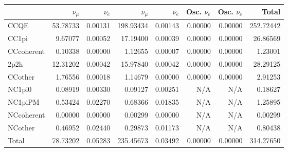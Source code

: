 \begin{tabular} { | l ||r | r | r | r | r | r | | r | }
\hline
              & $\nu_\mu$            & $\nu_e$              & $\bar{\nu}_{\mu}$    & $\bar{\nu}_{e}$      & Osc. $\nu_e$         & Osc. $\bar{\nu}_{e}$ & Total                \\ \hline\hline
 CCQE         & 53.78733             & 0.00131              & 198.93434            & 0.00143              & 0.00000              & 0.00000              & 252.72442            \\ \hline
 CC1pi        & 9.67077              & 0.00052              & 17.19400             & 0.00039              & 0.00000              & 0.00000              & 26.86569             \\ \hline
 CCcoherent   & 0.10338              & 0.00000              & 1.12655              & 0.00007              & 0.00000              & 0.00000              & 1.23001              \\ \hline
 2p2h         & 12.31202             & 0.00042              & 15.97840             & 0.00042              & 0.00000              & 0.00000              & 28.29125             \\ \hline
 CCother      & 1.76556              & 0.00018              & 1.14679              & 0.00000              & 0.00000              & 0.00000              & 2.91253              \\ \hline
 NC1pi0       & 0.08919              & 0.00330              & 0.09127              & 0.00251              & N/A                  & N/A                  & 0.18627              \\ \hline
 NC1piPM      & 0.53424              & 0.02270              & 0.68366              & 0.01835              & N/A                  & N/A                  & 1.25895              \\ \hline
 NCcoherent   & 0.00000              & 0.00000              & 0.00299              & 0.00000              & N/A                  & N/A                  & 0.00299              \\ \hline
 NCother      & 0.46952              & 0.02440              & 0.29873              & 0.01173              & N/A                  & N/A                  & 0.80438              \\ \hline
\hline
 Total        & 78.73202             & 0.05283              & 235.45673            & 0.03492              & 0.00000              & 0.00000              & 314.27650            \\ \hline

\end{tabular}
